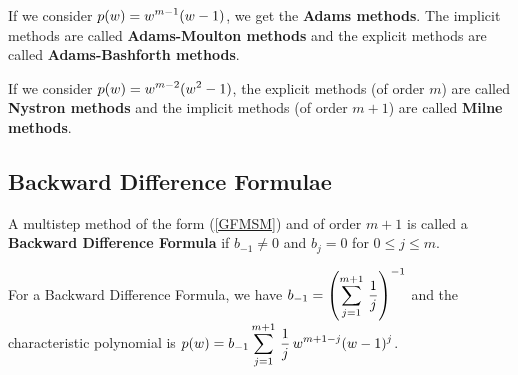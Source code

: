 \begin{rmk}
If we consider $\displaystyle p(w) = w^{m-1}(w-1)$,
we get the {\bfseries Adams methods}.
The implicit methods are called 
{\bfseries Adams-Moulton methods} and the explicit methods are called 
{\bfseries Adams-Bashforth methods}.

If we consider $\displaystyle p(w) = w^{m-2}(w^2-1)$, the explicit
methods (of order $m$) are called
{\bfseries Nystron methods}
and the implicit methods (of order $m+1$) are called
{\bfseries Milne methods}.
\end{rmk}

\subsection{Backward Difference Formulae}

\begin{defn}
A multistep method of the form (\ref{GFMSM}) and of order $m+1$ is
called a
{\bfseries Backward Difference Formula}
if $b_{-1} \neq 0$ and $b_j=0$ for $0 \leq j \leq m$.
\end{defn}

\begin{prop}
For a Backward Difference Formula, we have
$\displaystyle b_{-1} = \left(\sum_{j=1}^{m+1}\,\frac{1}{j} \right)^{-1}$
and the characteristic polynomial is
$\displaystyle p(w) = b_{-1}\sum_{j=1}^{m+1}\,\frac{1}{j}\,w^{m+1-j}(w-1)^j$.
\end{prop}

